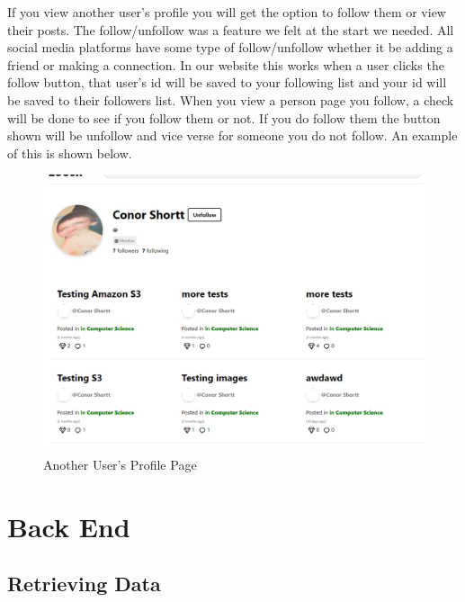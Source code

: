 If you view another user's profile you will get the option to follow them or view their posts. 
The follow/unfollow was a feature we felt at the start we needed. All social media platforms have some type of follow/unfollow whether it be adding a friend or making a connection. In our website this works when a user clicks the follow button, that user's id will be saved to your following list and your id will be saved to their followers list. When you view a person page you follow, a check will be done to see if you follow them or not. If you do follow them the button shown will be unfollow and vice verse for someone you do not follow. An example of this is shown below.
\begin{figure}[H]
  \centering
  \includegraphics[scale=0.4]{img/OtherProfile.PNG}
  \caption{Another User's Profile Page}
  \label{fig:OtherProfile}
\end{figure}

\section{Back End}

\subsection{Retrieving Data}

